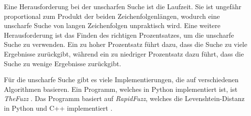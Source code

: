 Eine Herausforderung bei der unscharfen Suche ist die Laufzeit.
Sie ist ungefähr proportional zum Produkt der beiden Zeichenfolgenlängen, wodurch eine unscharfe Suche von langen Zeichenfolgen unpraktisch wird.
Eine weitere Herausforderung ist das Finden des richtigen Prozentsatzes, um die unscharfe Suche zu verwenden.
Ein zu hoher Prozentsatz führt dazu, dass die Suche zu viele Ergebnisse zurückgibt, während ein zu niedriger Prozentsatz dazu führt, dass die Suche zu wenige Ergebnisse zurückgibt.

Für die unscharfe Suche gibt es viele Implementierungen, die auf verschiedenen Algorithmen basieren.
Ein Programm, welches in Python implementiert ist, ist \textit{TheFuzz} \autocite{noauthor_seatgeekthefuzz_2024}.
Das Programm basiert auf \textit{RapidFuzz}, welches die Levenshtein-Distanz in Python und C++ implementiert \autocites{noauthor_rapidfuzzrapidfuzz_2024}.

